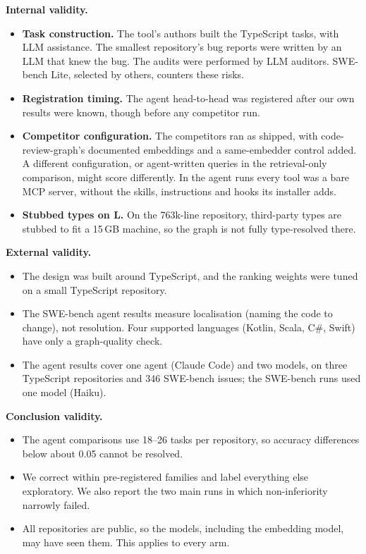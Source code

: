 \documentclass[sigconf,nonacm]{acmart}
\newcommand{\crg}{code-review-graph\xspace}
\begin{document}
\par\smallskip\noindent\textbf{Internal validity.}
\begin{itemize}
\item \textbf{Task construction.} The tool's authors built the TypeScript tasks, with LLM assistance. The smallest repository's bug reports were written by an LLM that knew the bug. The audits were performed by LLM auditors. SWE-bench Lite, selected by others, counters these risks.
\item \textbf{Registration timing.} The agent head-to-head was registered after our own results were known, though before any competitor run.
\item \textbf{Competitor configuration.} The competitors ran as shipped, with \crg's documented embeddings and a same-embedder control added. A different configuration, or agent-written queries in the retrieval-only comparison, might score differently. In the agent runs every tool was a bare MCP server, without the skills, instructions and hooks its installer adds.
\item \textbf{Stubbed types on L.} On the 763k-line repository, third-party types are stubbed to fit a 15\,GB machine, so the graph is not fully type-resolved there.
\end{itemize}

\par\smallskip\noindent\textbf{External validity.}
\begin{itemize}
\item The design was built around TypeScript, and the ranking weights were tuned on a small TypeScript repository.
\item The SWE-bench agent results measure localisation (naming the code to change), not resolution. Four supported languages (Kotlin, Scala, C\#, Swift) have only a graph-quality check.
\item The agent results cover one agent (Claude Code) and two models, on three TypeScript repositories and 346 SWE-bench issues; the SWE-bench runs used one model (Haiku).
\end{itemize}

\par\smallskip\noindent\textbf{Conclusion validity.}
\begin{itemize}
\item The agent comparisons use 18--26 tasks per repository, so accuracy differences below about 0.05 cannot be resolved.
\item We correct within pre-registered families and label everything else exploratory. We also report the two main runs in which non-inferiority narrowly failed.
\item All repositories are public, so the models, including the embedding model, may have seen them. This applies to every arm.
\end{itemize}
\end{document}
